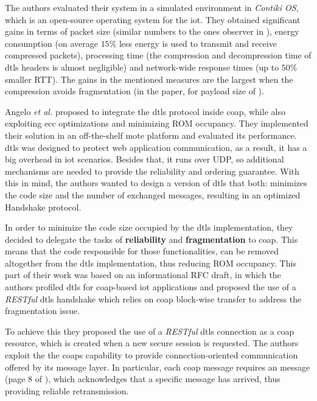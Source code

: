 \documentclass{llncs}
\begin{document}
{The authors evaluated their system in a simulated environment in \textit{Contiki OS}\cite{ContikiT75:online}, which is an open-source operating system for the \gls{iot}.
They obtained significant gains in terms of packet size (similar numbers to the
ones observer in \cite{6LoWPANC53:online}), energy consumption (on average $15\%$ less
energy is used to transmit and receive compressed packets), processing time
(the compression and decompression time of \gls{dtls} headers is almost negligible)
and network-wide response times (up to $50\%$ smaller RTT). The
gains in the mentioned measures are the largest when the compression avoids
fragmentation (in the paper, for payload size of ).

Angelo \textit{et al.} \cite{Security5:online} proposed to integrate the \gls{dtls} protocol
inside \gls{coap}, while also exploiting \gls{ecc} optimizations and minimizing
ROM occupancy. They implemented their solution in an off-the-shelf mote platform
and evaluated its performance. \gls{dtls} was designed to protect web application communication, as a result,
it has a big overhead in \gls{iot} scenarios. Besides that, it runs over UDP,
so additional mechanisms are needed to provide the reliability and ordering
guarantee. With this in mind, the authors wanted to design a version of \gls{dtls}
that both: minimizes the code size and the number of exchanged messages, resulting
in an optimized Handshake protocol.

In order to minimize the code size occupied by the \gls{dtls} implementation, they
decided to delegate the tasks of \textbf{reliability} and \textbf{fragmentation} to
\gls{coap}. This means that the code responsible for those functionalities,
can be removed altogether from the \gls{dtls} implementation, thus reducing ROM
occupancy. This part of their work was based on an informational RFC draft\cite{I-D.keoh-dtls-profile-iot}, in which the
authors profiled \gls{dtls} for \gls{coap}-based \gls{iot} applications and proposed
the use of a \textit{RESTful} \gls{dtls} handshake which relies on \gls{coap} block-wise
transfer to address the fragmentation issue.

To achieve this they  proposed the use of a \textit{RESTful} \gls{dtls} connection as a \gls{coap} resource,
which is created when a new secure session is requested.
The authors exploit the the \gls{coap}s capability to provide connection-oriented
communication offered by its message layer. In particular, each 
\gls{coap} message requires an  message (page 8 of  \cite{RFC7252}),
which acknowledges that a specific  message has arrived, thus
providing reliable retransmission.

}
\end{document}
